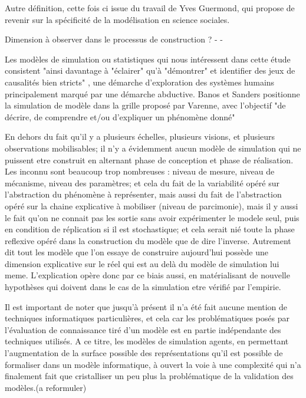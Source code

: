 {Autre définition, cette fois ci issue du travail de Yves Guermond, qui propose de revenir sur la spécificité de la modélisation en science sociales.


Dimension à observer dans le processus de construction ? 
-
-


Les modèles de simulation \autocite{Banos2013a} ou statistiques \autocite{Sanders2000} qui nous intéressent dans cette étude consistent "ainsi davantage à "éclairer" qu'à "démontrer" et identifier des jeux de causalités bien stricts" \autocite{Sanders2000}, une démarche d'exploration des systèmes humains principalement marqué par une démarche abductive. Banos et Sanders positionne la simulation de modèle dans la grille proposé par Varenne, avec l'objectif "de décrire, de comprendre et/ou d'expliquer un phénomène donné" \autocite[833]{Banos2013a} 

En dehors du fait qu'il y a plusieurs échelles, plusieurs visions, et plusieurs observations mobilisables; il n'y a évidemment aucun modèle de simulation qui ne puissent etre construit en alternant phase de conception et phase de réalisation. Les inconnu sont beaucoup trop nombreuses : niveau de mesure, niveau de mécanisme, niveau des paramètres; et cela du fait de la variabilité opéré sur l'abstraction du phénomène à représenter, mais aussi du fait de l'abstraction opéré sur la chaine explicative à mobiliser (niveau de parcimonie), mais il y aussi le fait qu'on ne connait pas les sortie sans avoir expérimenter le modele seul, puis en condition de réplication si il est stochastique; et cela serait nié toute la phase reflexive opéré dans la construction du modèle que de dire l'inverse. Autrement dit tout les modèle que l'on essaye de construire aujourd'hui possède une dimension explicative sur le réel qui est au delà du modèle de simulation lui meme. L'explication opère donc par ce biais aussi, en matérialisant de nouvelle hypothèses qui doivent dans le cas de la simulation etre vérifié par l'empirie.

Il est important de noter que jusqu'à présent il n'a été fait aucune mention de techniques informatiques particulières, et cela car les problématiques posés par l'évaluation de connaissance tiré d'un modèle est en partie indépendante des techniques utilisés. A ce titre, les modèles de simulation agents, en permettant l'augmentation de la surface possible des représentations qu'il est possible de formaliser dans un modèle informatique, à ouvert la voie à une complexité qui n'a finalement fait que cristalliser un peu plus la problématique de la validation des modèles.(a reformuler)

}
